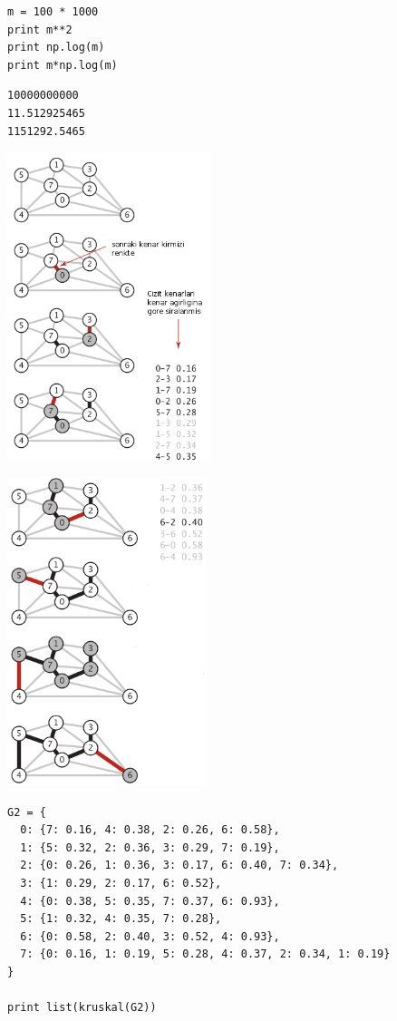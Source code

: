 \documentclass[12pt,fleqn]{article}\usepackage{../common}
\begin{document}
\begin{verbatim}
m = 100 * 1000
print m**2
print np.log(m)
print m*np.log(m)
\end{verbatim}

\begin{verbatim}
10000000000
11.512925465
1151292.5465
\end{verbatim}


\includegraphics[height=9cm]{sedge_krus_1.png}

\includegraphics[height=9cm]{sedge_krus_2.png}


\begin{verbatim}
G2 = {
  0: {7: 0.16, 4: 0.38, 2: 0.26, 6: 0.58},
  1: {5: 0.32, 2: 0.36, 3: 0.29, 7: 0.19},
  2: {0: 0.26, 1: 0.36, 3: 0.17, 6: 0.40, 7: 0.34},
  3: {1: 0.29, 2: 0.17, 6: 0.52},
  4: {0: 0.38, 5: 0.35, 7: 0.37, 6: 0.93},
  5: {1: 0.32, 4: 0.35, 7: 0.28},
  6: {0: 0.58, 2: 0.40, 3: 0.52, 4: 0.93},
  7: {0: 0.16, 1: 0.19, 5: 0.28, 4: 0.37, 2: 0.34, 1: 0.19}
} 

print list(kruskal(G2))
\end{verbatim}
\end{document}
